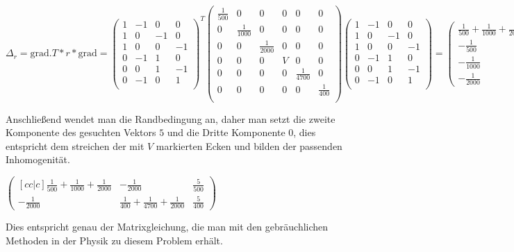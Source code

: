 \documentclass[11pt,a4paper,leqno]{report}
\numberwithin{equation}{chapter}
\begin{document}
\begin{center}
$
\Delta_r  = \text{grad}.T * r * \text{grad} = 
\begin{pmatrix}
1 & -1 & 0 & 0\\
1 & 0 & -1 & 0\\
1 & 0 & 0 & -1\\
0 & -1 & 1 & 0\\
0 & 0 & 1 & -1\\
0 & -1 & 0& 1\\
\end{pmatrix}^T
\begin{pmatrix}
\frac{1}{500}& 0 &0& 0& 0&0\\
0& \frac{1}{1000} & 0 & 0 &0&0\\
0 & 0 & \frac{1}{2000} & 0 &0&0\\
0 & 0 & 0 & V & 0&0\\
0 & 0 & 0 & 0 & \frac{1}{4700}&0\\
0 & 0 & 0& 0 & 0 &\frac{1}{400}\\
\end{pmatrix}
\begin{pmatrix}
1 & -1 & 0 & 0\\
1 & 0 & -1 & 0\\
1 & 0 & 0 & -1\\
0 & -1 & 1 & 0\\
0 & 0 & 1 & -1\\
0 & -1 & 0& 1\\
\end{pmatrix}=
\begin{pmatrix}
	\frac{1}{500} + \frac{1}{1000} + \frac{1}{2000}& -\frac{1}{500}  & -\frac{1}{1000} & -\frac{1}{2000}\\
	-\frac{1}{500}  & \frac{1}{500} + V + \frac{1}{400} & -V & -\frac{1}{400}\\
	-\frac{1}{1000} & -V& \frac{1}{1000} + V + \frac{1}{4700} & -\frac{1}{4700} \\
	-\frac{1}{2000} & -\frac{1}{400}&-\frac{1}{4700}  & \frac{1}{400} + \frac{1}{4700} + \frac{1}{2000}
\end{pmatrix}
$
\end{center}
Anschlie\ss{}end wendet man die Randbedingung an, daher man setzt die zweite Komponente des gesuchten Vektors $5$ und die Dritte Komponente $0$, dies entspricht dem streichen der mit $V$ markierten Ecken und bilden der passenden Inhomogenit\"at.
\begin{center}
	$
	\begin{pmatrix}[cc|c]
	\frac{1}{500} + \frac{1}{1000} + \frac{1}{2000} & -\frac{1}{2000} & \frac{5}{500}\\
	-\frac{1}{2000}& \frac{1}{400} + \frac{1}{4700} + \frac{1}{2000} & \frac{5}{400}
	\end{pmatrix}
	$
\end{center}
Dies entspricht genau der Matrixgleichung, die man mit den gebr\"auchlichen Methoden in der Physik zu diesem Problem erh\"alt.
\end{document}
